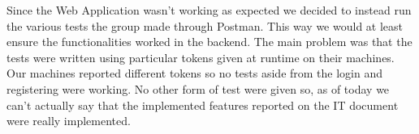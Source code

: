 Since the Web Application wasn't working as expected we decided to instead run the various tests the group made through Postman. This way we would at least ensure the functionalities worked in the backend. The main problem was that the tests were written using particular tokens given at runtime on their machines. Our machines reported different tokens so no tests aside from the login and registering were working. No other form of test were given so, as of today we can't actually say that the implemented features reported on the IT document were really implemented.
